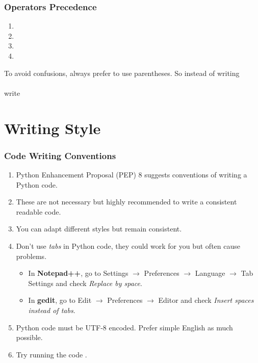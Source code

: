 \documentclass{beamer}
\newcounter{sauvegardeenumi}
\newcommand{\suite}{\setcounter{enumi}{\thesauvegardeenumi}}
\begin{document}
\begin{frame}[fragile]
\frametitle{Operators Precedence}
\begin{enumerate}
\suite
\item {}
\item {}
\item {}
\item {}
\end{enumerate}
To avoid confusions, always prefer to use parentheses. So instead of writing \\
 \\
write \\
\end{frame}

\section{Writing Style}

\begin{frame}
\frametitle{Code Writing Conventions}
\begin{enumerate}
\item Python Enhancement Proposal (PEP) 8 suggests conventions of writing a Python code.
\item These are not necessary but highly recommended to write a consistent readable code.
\item You can adapt different styles but remain consistent.
\item Don't use \emph{tabs} in Python code, they could work for you but often cause problems.
\begin{itemize}
\item In \textbf{Notepad++}, go to Settings $\rightarrow$ Preferences $\rightarrow$ Language $\rightarrow$ Tab Settings and check \emph{Replace by space}.
\item In \textbf{gedit}, go to Edit $\rightarrow$ Preferences $\rightarrow$ Editor and check \emph{Insert spaces instead of tabs}.
\end{itemize}
\item Python code must be UTF-8 encoded. Prefer simple English as much possible.
\item Try running the code .
\end{enumerate}
\end{frame}
\end{document}
